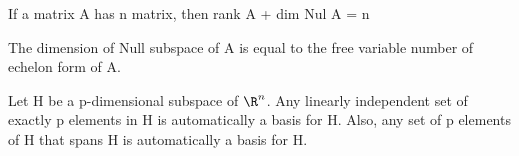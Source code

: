 \begin{theorem}
    If a matrix A has n matrix, then rank A + dim Nul A = n
\end{theorem}

\begin{remark}
    The dimension of Null subspace of A is equal to the free variable number of echelon form of A.
\end{remark}

\break
\begin{theorem}
    Let H be a p-dimensional subspace of \(\R^n\). Any linearly independent set of exactly p elements in H is automatically a basis for H. Also, any set of p elements of H that spans H is automatically a basis for H. 
\end{theorem}